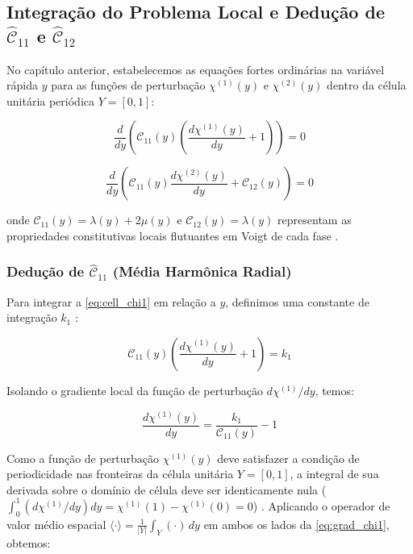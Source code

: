 \subsection{Integração do Problema Local e Dedução de $\hat{\mathcal{C}}_{11}$ e $\hat{\mathcal{C}}_{12}$} \label{subsec:deducao_hat_c}

No capítulo anterior, estabelecemos as equações fortes ordinárias na variável rápida $y$ para as funções de perturbação $\chi^{(1)}(y)$ e $\chi^{(2)}(y)$ dentro da célula unitária periódica $Y = [0, 1]$:

\begin{equation}
  \frac{d}{d y} \left( \mathcal{C}_{11}(y) \left( \frac{d \chi^{(1)}(y)}{d y} + 1 \right) \right) = 0
  \label{eq:cell_chi1}
\end{equation}

\begin{equation}
  \frac{d}{d y} \left( \mathcal{C}_{11}(y) \frac{d \chi^{(2)}(y)}{d y} + \mathcal{C}_{12}(y) \right) = 0
  \label{eq:cell_chi2}
\end{equation}

onde $\mathcal{C}_{11}(y) = \lambda(y) + 2 \mu(y)$ e $\mathcal{C}_{12}(y) = \lambda(y)$ representam as propriedades constitutivas locais flutuantes em Voigt de cada fase \cite{Sadd2009}.

\subsubsection{Dedução de $\hat{\mathcal{C}}_{11}$ (Média Harmônica Radial)}

Para integrar a \eqref{eq:cell_chi1} em relação a $y$, definimos uma constante de integração $k_1$ \cite{bakhvalov1989}:

\begin{equation}
  \mathcal{C}_{11}(y) \left( \frac{d \chi^{(1)}(y)}{d y} + 1 \right) = k_1
  \label{eq:integ_chi1_1}
\end{equation}

Isolando o gradiente local da função de perturbação $d \chi^{(1)} / d y$, temos:

\begin{equation}
  \frac{d \chi^{(1)}(y)}{d y} = \frac{k_1}{\mathcal{C}_{11}(y)} - 1
  \label{eq:grad_chi1}
\end{equation}

Como a função de perturbação $\chi^{(1)}(y)$ deve satisfazer a condição de periodicidade nas fronteiras da célula unitária $Y = [0, 1]$, a integral de sua derivada sobre o domínio de célula deve ser identicamente nula ($\int_0^1 (d \chi^{(1)} / d y) d y = \chi^{(1)}(1) - \chi^{(1)}(0) = 0$) \cite{bakhvalov1989}. Aplicando o operador de valor médio espacial $\langle \cdot \rangle = \frac{1}{|Y|} \int_Y (\cdot) \, d y$ em ambos os lados da \eqref{eq:grad_chi1}, obtemos:

